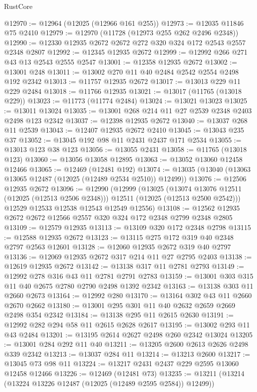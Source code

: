 \begin{lexlean}{RustCore}
\begin{coremodule}
@12970 := @12964 (@12025 (@12966 @161 @255))
@12973 := @12035 @11846 @75 @2410
@12979 := @12970 (@11728 (@12973 @255 @262 @2496 @2348))
@12990 := @12330 @12935 @2672 @2672 @272 @320 @324 @172 @2543 @2557 @2348 @2807
@12992 := @12345 @12935 @2672
@12999 := @12992 @266 @271 @43 @13 @2543 @2555 @2547
@13001 := @12358 @12935 @2672
@13002 := @13001 @248
@13011 := @13002 @270 @11 @40 @2484 @2542 @2554 @2498 @192 @2342
@13013 := @11757 @12935 @2672
@13017 := @13013 @229 @11 @229 @2484
@13018 := @11766 @12935
@13021 := @13017 (@11765 (@13018 @229))
@13023 := @11773 (@11774 @2484)
@13024 := @13021 @13023
@13025 := @13011 @13024
@13035 := @13001 @268 @214 @11 @27 @2539 @2348 @2403 @2498 @123 @2342
@13037 := @12398 @12935 @2672
@13040 := @13037 @268 @11 @2539
@13043 := @12407 @12935 @2672 @2410
@13045 := @13043 @235 @37
@13052 := @13045 @192 @98 @11 @2431 @2437 @171 @2534
@13055 := @13013 @123 @38 @123
@13056 := @13055 @2431
@13058 := @11765 (@13018 @123)
@13060 := @13056 @13058 @12895
@13063 := @13052 @13060 @12458 @12466
@13065 := @12469 (@12481 @192)
@13074 := @13035 (@13040 (@13063 @13065 @12487 (@12025 (@12489 @2534 @2510)) @12499))
@13076 := @12506 @12935 @2672
@13096 := @12990
    (@12999
      (@13025
        (@13074 @13076 @12511 (@12025 (@12513 @2506 @2348)))
        @12511
        (@12025 (@12513 @2500 @2542)))
      @12529
      @12533
      @12538
      @12543
      @12549
      @12556)
@13108 := @12562 @12935 @2672 @2672 @12566 @2557 @320 @324 @172 @2348 @2799 @2348 @2805
@13109 := @12579 @12935
@13113 := @13109 @320 @172 @2348 @2798
@13115 := @12588 @12935 @2672
@13123 := @13115 @275 @172 @319 @40 @2348 @2797 @2563 @12601
@13128 := @12060 @12935 @2672 @319 @40 @2797
@13136 := @12069 @12935 @2672 @317 @214 @11 @27 @2795 @2403
@13138 := @12619 @12935 @2672
@13142 := @13138 @317 @11 @2781 @2793
@13149 := @12992 @278 @316 @43 @11 @2781 @2791 @2783
@13159 := @13001 @303 @315 @11 @40 @2675 @2780 @2790 @2498 @1392 @2342
@13163 := @13138 @303 @11 @2660 @2673
@13164 := @12992 @280
@13170 := @13164 @302 @43 @11 @2660 @2670 @2662
@13180 := @13001 @295 @301 @11 @40 @2632 @2659 @2669 @2498 @354 @2342
@13184 := @13138 @295 @11 @2615 @2630
@13191 := @12992 @282 @294 @58 @11 @2615 @2628 @2617
@13195 := @13002 @293 @11 @43 @2484
@13201 := @13195 @2614 @2627 @2498 @260 @2342 @13024
@13205 := @13001 @284 @292 @11 @40
@13211 := @13205 @2600 @2613 @2626 @2498 @339 @2342
@13213 := @13037 @284 @11
@13214 := @13213 @2600
@13217 := @13045 @73 @98 @11
@13224 := @13217 @2431 @2437 @229 @2595 @13060 @12458 @12466
@13226 := @12469 (@12481 @73)
@13235 := @13211 (@13214 (@13224 @13226 @12487 (@12025 (@12489 @2595 @2584)) @12499))

\end{coremodule}
\end{lexlean}
